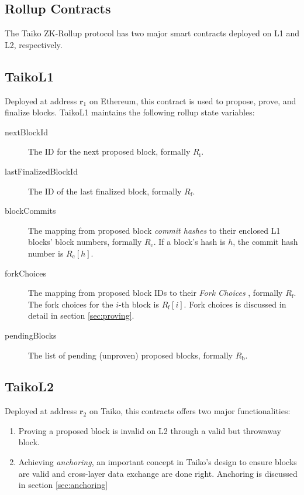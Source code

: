 \documentclass[9pt,oneside]{amsart}
\begin{document}
\begin{multicols}{2}
\section{Rollup Contracts}
The Taiko ZK-Rollup protocol has two major smart contracts deployed on L1 and L2, respectively.

\subsection{TaikoL1} Deployed at address $\mathbf{r_{\mathrm{1}}}$ on Ethereum, this contract is used to propose, prove, and finalize blocks. TaikoL1  maintains the following rollup state variables:

\begin{description}
\item[nextBlockId] The ID for the next proposed block, formally $R_\mathrm{i}$.
\item[lastFinalizedBlockId] The ID of the last finalized block, formally $R_\mathrm{f}$.
\item [blockCommits] The mapping from proposed block \textit{commit hashes} to their enclosed L1 blocks' block numbers, formally $R_\mathrm{c}$. If a block's hash is $h$, the commit hash number is $R_\mathrm{c}[h]$.
\item[forkChoices] The mapping from proposed block IDs to their \textit{Fork Choices} , formally $R_\mathrm{f}$. The fork choices for the $i$-th block is $R_\mathrm{f}[i]$. Fork choices is discussed in detail in section \ref{sec:proving}.
\item[pendingBlocks] The list of pending (unproven) proposed blocks, formally $R_\mathrm{b}$.
\end{description}



\subsection{TaikoL2} Deployed at address $\mathbf{r_{\mathrm{2}}}$ on Taiko, this contracts offers two major functionalities:
\begin{enumerate}
\item Proving a proposed block is invalid on L2 through a valid but throwaway block.
\item Achieving \textit{anchoring}, an important concept in Taiko's design to ensure blocks are valid and cross-layer data exchange are done right. Anchoring is discussed in section \ref{sec:anchoring}
\end{enumerate}


\end{multicols}
\end{document}
